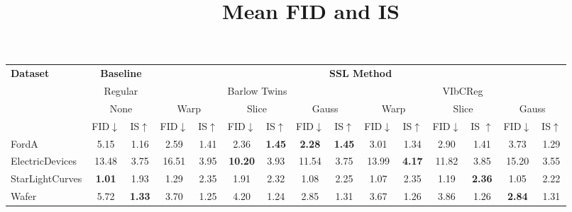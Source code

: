 \documentclass[../../thesis.tex]{subfiles}
\begin{document}
\begin{table}[h]
    \centering
    \title{Mean FID and IS}
    \begin{adjustbox}{width=\textwidth}
     \begin{tabular}{lcc|cc|cc|cc|cc|cc|cc} %
        \toprule
        \multirow{4}{*}{\textbf{Dataset}} & \multicolumn{2}{c}{\textbf{Baseline}} & \multicolumn{12}{c}{\textbf{SSL Method}} \\
                                            \cmidrule(lr){2-3} \cmidrule(lr){4-15}
                                          & \multicolumn{2}{c}{Regular}           & \multicolumn{6}{c}{Barlow Twins}                                                 &  \multicolumn{6}{c}{VIbCReg} \\
                                          \cmidrule(lr){2-3} \cmidrule(lr){4-9} \cmidrule(lr){10-15}
                                          &   \multicolumn{2}{c}{None}            & \multicolumn{2}{c}{Warp}  & \multicolumn{2}{c}{Slice} & \multicolumn{2}{c}{Gauss} & \multicolumn{2}{c}{Warp} & \multicolumn{2}{c}{Slice} & \multicolumn{2}{c}{Gauss} \\
                                          \cmidrule(lr){2-3} \cmidrule(lr){4-5} \cmidrule(lr){6-7} \cmidrule(lr){8-9} \cmidrule(lr){10-11} \cmidrule(lr){12-13}\cmidrule(lr){14-15}
                                          & FID$\downarrow$ & IS$\uparrow $                             & FID$\downarrow$ & IS$\uparrow$                  & FID$\downarrow$ & IS$\uparrow$                & FID$\downarrow$ & IS$\uparrow$                 & FID$\downarrow$ & IS$\uparrow$                 & FID$\downarrow$ & IS $\uparrow$                 & FID$\downarrow$ & IS$\uparrow$   \\
        \midrule
        FordA                   & 5.15 & 1.16 & 2.59 & 1.41 & 2.36 &\textbf{ 1.45} & \textbf{2.28} & \textbf{1.45} & 3.01 & 1.34 & 2.90 & 1.41 & 3.73 & 1.29 \\
        ElectricDevices         & 13.48 & 3.75 & 16.51 & 3.95 & \textbf{10.20} & 3.93 & 11.54 & 3.75 & 13.99 & \textbf{4.17} & 11.82 & 3.85 & 15.20 & 3.55 \\
        StarLightCurves         & \textbf{1.01} & 1.93 & 1.29 & 2.35 & 1.91 & 2.32 & 1.08 & 2.25 & 1.07 & 2.35 & 1.19 & \textbf{2.36} & 1.05 & 2.22 \\
        Wafer                   & 5.72 & \textbf{1.33} & 3.70 & 1.25 & 4.20 & 1.24 & 2.85 & 1.31 & 3.67 & 1.26 & 3.86 & 1.26 & \textbf{2.84} & 1.31 \\

\end{tabular}
\end{adjustbox}
\end{table}
\end{document}
